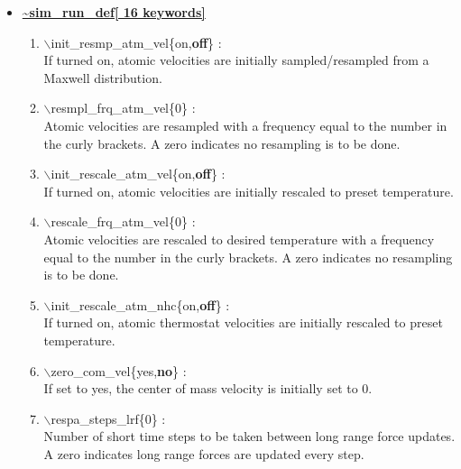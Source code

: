 \documentclass[12pt]{article}
\begin{document}
\begin{itemize}
\clearpage
\huge
\item[] \underline{\bf \~{}sim\_run\_def[ 16 keywords]}
\begin{enumerate}
 \vspace{0.15in} \Large
 \item   $\backslash$init\_resmp\_atm\_vel\{on,{\bf off}\} : \\
     \large
     If turned on, atomic velocities are initially sampled/resampled from a 
     Maxwell distribution.


 \vspace{0.15in} \Large
 \item   $\backslash$resmpl\_frq\_atm\_vel\{0\} : \\
     \large
     Atomic velocities are resampled with a frequency equal to the number 
     in the curly brackets.  A zero indicates no resampling is to be done.


 \vspace{0.15in} \Large
 \item   $\backslash$init\_rescale\_atm\_vel\{on,{\bf off}\} : \\
    \large
    If turned on, atomic velocities are initially rescaled to preset 
    temperature.

 \vspace{0.15in} \Large
 \item   $\backslash$rescale\_frq\_atm\_vel\{0\} : \\
    \large
    Atomic velocities are rescaled to desired temperature
    with a frequency equal to the number in the
    curly brackets.  A zero indicates no resampling is to be done.

 \vspace{0.15in} \Large
 \item   $\backslash$init\_rescale\_atm\_nhc\{on,{\bf off}\} : \\
    \large
    If turned on, atomic thermostat velocities are initially rescaled to 
    preset temperature.

 \vspace{0.15in} \Large
 \item   $\backslash$zero\_com\_vel\{yes,{\bf no}\} : \\
    \large
    If set to yes, the center of mass velocity is initially set to 0.

 \vspace{0.15in} \Large
 \item   $\backslash$respa\_steps\_lrf\{0\} : \\
    \large
    Number of short time steps to be taken between long range force updates.
    A zero indicates long range forces are updated every step.


\end{enumerate}
\end{itemize}
\end{document}
